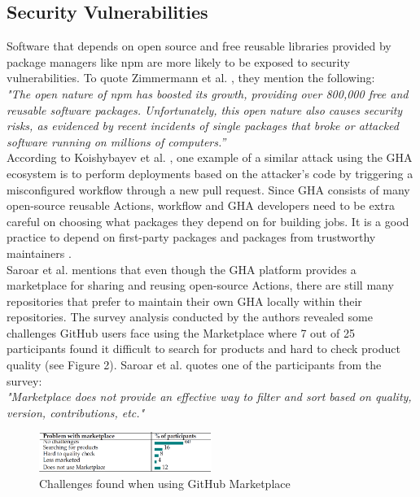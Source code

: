 \documentclass[conference]{IEEEtran}
\begin{document}
    \subsection{Security Vulnerabilities}
        Software that depends on open source and free reusable libraries provided by package managers like npm are more likely to be exposed to security vulnerabilities. To quote Zimmermann et al. \cite{zimmermann2019small}, they mention the following: \\

        \textit{"The open nature of npm has boosted its growth, providing over 800,000 free and reusable software packages. Unfortunately, this open nature also causes security risks, as evidenced by recent incidents of single packages that broke or attacked software running on millions of computers.”} \\

        According to Koishybayev et al. \cite{koishybayev2022characterizing}, one example of a similar attack using the GHA ecosystem is to perform deployments based on the attacker’s code by triggering a misconfigured workflow through a new pull request. Since GHA consists of many open-source reusable Actions, workflow and GHA developers need to be extra careful on choosing what packages they depend on for building jobs. It is a good practice to depend on first-party packages and packages from trustworthy maintainers \cite{zimmermann2019small}. \\

        Saroar et al. \cite{saroar2023developers} mentions that even though the GHA platform provides a marketplace for sharing and reusing open-source Actions, there are still many repositories that prefer to maintain their own GHA locally within their repositories. The survey analysis conducted by the authors revealed some challenges GitHub users face using the Marketplace where 7 out of 25 participants found it difficult to search for products and hard to check product quality (see Figure 2). Saroar et al. \cite{saroar2023developers} quotes one of the participants from the survey: \\

\textit{"Marketplace does not provide an effective way to filter and sort based on quality, version, contributions, etc."}\\

\begin{figure} [h]
\includegraphics[width=0.5\textwidth]{Table 1.png}
\caption{Challenges found when using GitHub Marketplace \cite{saroar2023developers} }
\end{figure}
\end{document}
